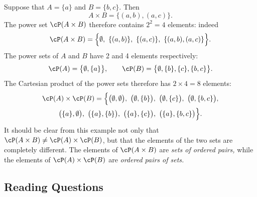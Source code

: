 \begin{example}
Suppose that $A=\{a\}$ and $B=\{b,c\}$. Then
\[A\times B=\{(a,b),(a,c)\}.\]
The power set $\cP(A\times B)$ therefore contains $2^2=4$ elements: indeed
\[\cP(A\times B)=\Big\{\emptyset,\ \{(a,b)\},\ \{(a,c)\},\ \{(a,b),(a,c)\}\Big\}.\]
The power sets of $A$ and $B$ have 2 and 4 elements respectively:
\[\cP(A)=\big\{\emptyset,\{a\}\big\},\qquad\cP(B)=\big\{\emptyset,\{b\},\{c\},\{b,c\}\big\}.\]
The Cartesian product of the power sets therefore has $2\times 4=8$ elements:
\begin{multline*}
\cP(A)\times\cP(B)
=\Big\{\big(\emptyset,\emptyset\big),\  \big(\emptyset,\{b\}\big),\  \big(\emptyset,\{c\}\big),\  \big(\emptyset,\{b,c\}\big),\\*
\big(\{a\},\emptyset\big),\  \big(\{a\},\{b\}\big),\  \big(\{a\},\{c\}\big),\  \big(\{a\},\{b,c\}\big)\Big\}.
\end{multline*}
It should be clear from this example not only that $\cP(A\times B)\neq\cP(A)\times\cP(B)$, but that the elements of the two sets are completely different. The elements of $\cP(A\times B)$ are \emph{sets of ordered pairs,} while the elements of $\cP(A)\times\cP(B)$ are \emph{ordered pairs of sets.}
\end{example}





\subsection*{Reading Questions}

